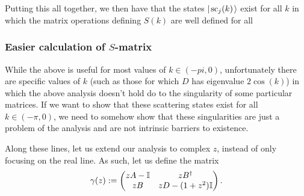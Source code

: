 \documentclass[../thesis-main/thesis-main]{subfiles}
\begin{document}
Putting this all together, we then have that the states $|\mspace{2mu} \text{sc}_j(k) \mspace{2mu} \rangle$ exist for all $k$ in which the matrix operations defining $S(k)$ are well defined for all 

\subsubsection{Easier calculation of $S$-matrix}


While the above is useful for most values of $k\in(-pi,0)$, unfortunately there are specific values of $k$ (such as those for which $D$ has eigenvalue $2\cos(k)$) in which the above analysis doesn't hold do to the singularity of some particular matrices.  If we want to show that these scattering states exist for all $k\in (-\pi,0)$, we need to somehow show that these singularities are just a problem of the analysis and are not intrinsic barriers to existence.

Along these lines, let us extend our analysis to complex $z$, instead of only focusing on the real line.  As such, let us define the matrix
\begin{equation}
  \gamma(z) := \begin{pmatrix}  z A - \mathbb{I} & z B^\dag\\
    z B & zD - (1+z^2) \mathbb{I}\end{pmatrix}.
    \label{eq:gamma_def}
\end{equation}
\end{document}
